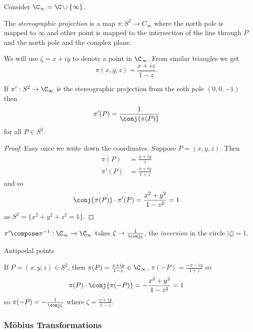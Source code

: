 \documentclass[a4paper]{article}
\begin{document}
Consider \(\C_\infty = \C \cup \{\infty\}\).

\begin{definition}
  The \emph{stereographic projection} is a map \(\pi: S^2 \to C_\infty\) where the north pole is mapped to \(\infty\) and other point is mapped to the intersection of the line through \(P\) and the north pole and the complex plane.
\end{definition}

We will use \(\zeta = x + iy\) to denote a point in \(\C_\infty\). From similar triangles we get
\[
  \pi(x, y, z) = \frac{x + iz}{1 - z}.
\]

\begin{lemma}
  If \(\pi': S^2 \to \C_\infty\) is the stereographic projection from the soth pole \((0, 0, -1)\) then
  \[
    \pi'(P) = \frac{1}{\conj{\pi(P)}}
  \]
  for all \(P \in S^2\).
\end{lemma}

\begin{proof}
  Easy once we write down the coordinates. Suppose \(P = (x, y, z)\). Then
  \begin{align*}
    \pi(P) &= \frac{x + iy}{z} \\
    \pi'(P) &= \frac{x + iy}{1 + z}
  \end{align*}
  and so
  \[
    \conj{\pi(P)} \cdot \pi'(P) = \frac{x^2 + y^2}{1 - z^2} = 1
  \]
  as \(S^2 = \{x^2 + y^2 + z^2 = 1\}\).
\end{proof}

\begin{note}
  \(\pi' \compose \pi^{-1}: \C_\infty \to \C_\infty\) takes \(\zeta \to \frac{1}{\conj \zeta}\), the \emph{inversion} in the circle \(|\zeta| = 1\).
\end{note}

Antipodal points

If \(P = (x, y, z) \in S^2\), then \(\pi(P) = \frac{x + iy}{1 - z} \in \C_\infty\), \(\pi(-P) = \frac{-x - iy}{1 + z}\) so
\[
  \pi(P) \cdot \conj{\pi(-P)} = -\frac{x^2 + y^2}{1 - z^2} = 1
\]
so \(\pi(-P) = -\frac{1}{\conj \zeta}\) where \(\zeta = \frac{x + iy}{1 - z}\).

\subsubsection{Möbius Transformations}
\end{document}
